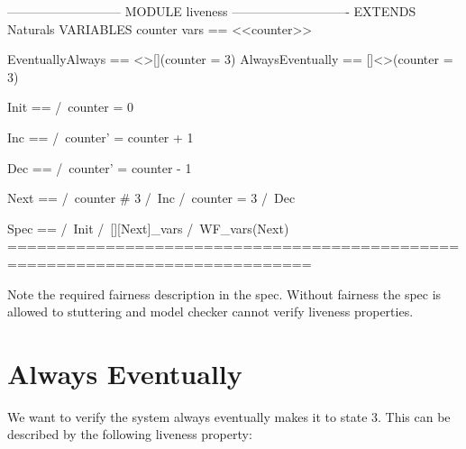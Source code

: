 \begin{tla}
--------------------------- MODULE liveness ----------------------------
EXTENDS Naturals
VARIABLES counter 
vars == <<counter>>

EventuallyAlways == <>[](counter = 3)
AlwaysEventually == []<>(counter = 3)

Init ==
    /\ counter = 0

Inc == 
    /\ counter' = counter + 1

Dec == 
    /\ counter' = counter - 1

Next ==
    \/ /\ counter # 3
       /\ Inc
    \/ /\ counter = 3
       /\ Dec

Spec ==
  /\ Init
  /\ [][Next]_vars
  /\ WF_vars(Next)
=============================================================================
\end{tla}
\begin{tlatex}
\@x{}\moduleLeftDash{}\moduleRightDash\@xx{}%
%
%
%
\@pvspace{8.0pt}%
%
%
\@pvspace{8.0pt}%
%
%
\@pvspace{8.0pt}%
%
%
\@pvspace{8.0pt}%
%
%
\@pvspace{8.0pt}%
%
%
%
%
%
\@pvspace{8.0pt}%
%
%
%
%
\@x{}\bottombar\@xx{}%
\end{tlatex}

Note the required fairness description in the spec. Without fairness the spec is
allowed to stuttering and model checker cannot verify liveness properties. 

\section{Always Eventually}

We want to verify the system always eventually makes it to state 3. This can be
described by the following liveness property:\newline

